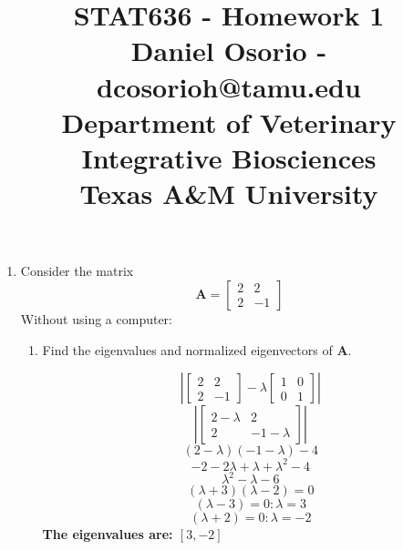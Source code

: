 \documentclass[12pt,a4paper]{paper}
\begin{document}
\title{STAT636 - Homework 1\\\small{Daniel Osorio - dcosorioh@tamu.edu\\Department of Veterinary Integrative Biosciences\\Texas A\&M University}}
\maketitle

\begin{enumerate}
\item Consider the matrix
\[\textbf{A} = \left[\begin{array}{cc}
    2 & 2 \\
    2 & -1
\end{array}\right]\]
Without using a computer:
\begin{enumerate}
\item Find the eigenvalues and normalized eigenvectors of \textbf{A}.
\begin{multicols}{2}
\begin{equation}
\left|\left[\begin{array}{cc}2 & 2 \\2 & -1\end{array}\right]-\lambda \left[\begin{array}{cc}1 & 0 \\0 & 1\end{array}\right]\right|
\end{equation}
\begin{equation}
\left|\left[\begin{array}{cc}
    2-\lambda & 2 \\
    2 & -1-\lambda
\end{array}\right]\right|
\end{equation}
\begin{equation}
\left(2-\lambda \right)\left(-1 -\lambda \right) - 4
\end{equation}
\begin{equation}
-2 -2\lambda + \lambda + \lambda^2 - 4
\end{equation}
\begin{equation}
\lambda^2 - \lambda -6
\end{equation}
\begin{equation}
\left(\lambda + 3\right)\left(\lambda - 2\right) = 0
\end{equation}
\begin{equation}
\left(\lambda - 3\right) = 0: \lambda = 3
\end{equation}
\begin{equation}
\left(\lambda + 2\right) = 0: \lambda = -2
\end{equation}
\textbf{The eigenvalues are: $\left[3 , -2\right]$}


\end{multicols}
\end{enumerate}
\end{enumerate}
\end{document}
